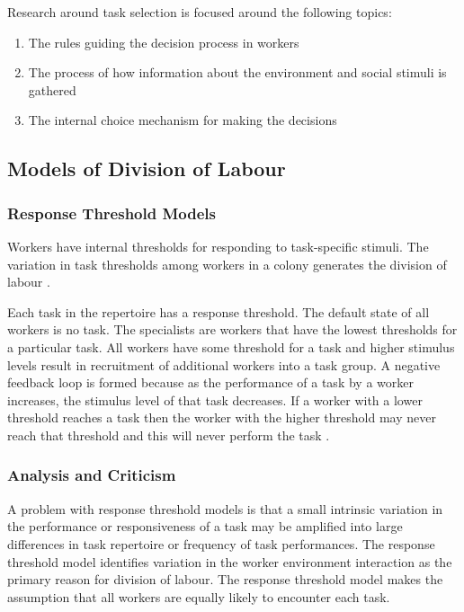 Research around task selection is focused around the following topics: 
\begin{enumerate}
	\item The rules guiding the decision process in workers
	\item The process of how information about the environment and social stimuli is gathered
	\item The internal choice mechanism for making the decisions
\end{enumerate}

\subsection{Models of Division of Labour}
\subsubsection{Response Threshold Models}

Workers have internal thresholds for responding to task-specific stimuli. The variation in task thresholds among workers in a colony generates the division of labour \cite{robinson1992regulation}. %

Each task in the repertoire has a response threshold. The default state of all workers is no task. The specialists are workers that have the lowest thresholds for a particular task. All workers have some threshold for a task and higher stimulus levels result in recruitment of additional workers into a task group. A negative feedback loop is formed because as the performance of a task by a worker increases, the stimulus level of that task decreases. If a worker with a lower threshold reaches a task then the worker with the higher threshold may never reach that threshold and this will never perform the task \cite{beshers2001models}.

\subsubsection{Analysis and Criticism}

A problem with response threshold models is that a small intrinsic variation in the performance or responsiveness of a task may be amplified into large differences in task repertoire or frequency of task performances. The response threshold model identifies variation in the worker environment interaction as the primary reason for division of labour. The response threshold model makes the assumption that all workers are equally likely to encounter each task.
  
